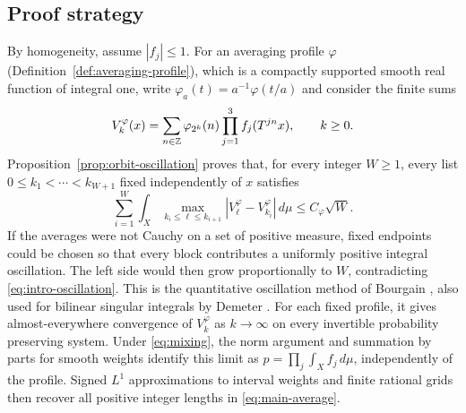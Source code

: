 \subsection{Proof strategy}

By homogeneity, assume $|f_j|\leq1$.  For an averaging profile $\varphi$
(Definition~\ref{def:averaging-profile}), which is a compactly supported
smooth real function of integral one, write
$\varphi_a(t)=a^{-1}\varphi(t/a)$ and consider the finite sums
\[
 V_k^\varphi(x)=\sum_{n\in\mathbb Z}\varphi_{2^k}(n)
           \prod_{j=1}^3 f_j(T^{jn}x),\qquad k\ge0.
\]
Proposition~\ref{prop:orbit-oscillation} proves that, for every integer
$W\geq1$, every list $0\le k_1<\cdots<k_{W+1}$ fixed independently of
$x$ satisfies
\begin{equation}
 \sum_{i=1}^W\int_X
    \max_{k_i\le\ell\le k_{i+1}}
        |V_\ell^\varphi-V_{k_i}^\varphi|\,d\mu
 \le C_\varphi\sqrt W.
 \label{eq:intro-oscillation}
\end{equation}
If the averages were not Cauchy on a set of positive measure, fixed endpoints
could be chosen so that every block contributes a uniformly positive integral
oscillation.  The left side would then grow proportionally to $W$, contradicting
\eqref{eq:intro-oscillation}.  This is the quantitative oscillation method
of Bourgain \cite[Section~2C]{Bourgain1989}, also used for bilinear singular
integrals by Demeter \cite{Demeter2007}.  For each fixed profile, it gives
almost-everywhere convergence of $V_k^\varphi$ as $k\to\infty$ on every
invertible probability preserving system.  Under \eqref{eq:mixing}, the norm
argument and summation by parts for smooth weights identify this limit as
$p=\prod_j\int_X f_j\,d\mu$, independently of the profile.  Signed $L^1$
approximations to interval weights and finite rational grids then recover
all positive integer lengths in \eqref{eq:main-average}.

